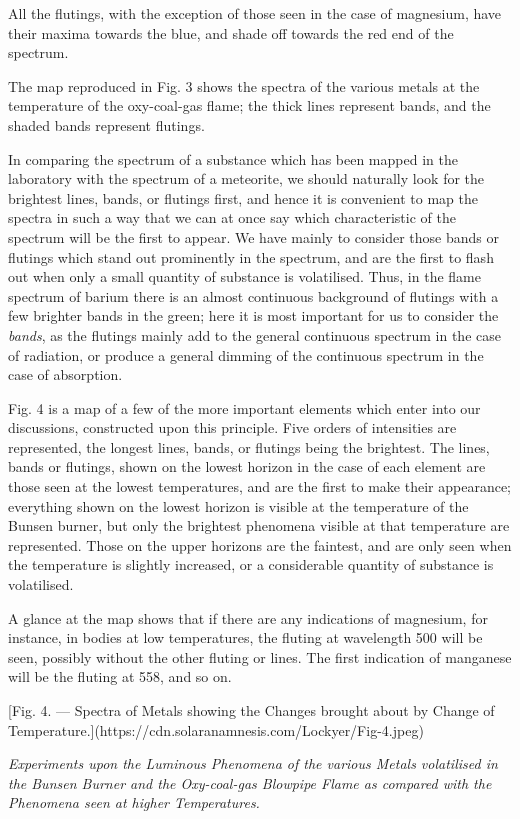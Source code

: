 \documentclass[a4paper, 12pt, oneside, polutonikogreek, english]{article}
\begin{document}
All the flutings, with the exception of those seen in the case of magnesium, have their maxima towards the blue, and shade off towards the red end of the spectrum.

The map reproduced in Fig. 3 shows the spectra of the various metals at the temperature of the oxy-coal-gas flame; the thick lines represent bands, and the shaded bands represent flutings.

In comparing the spectrum of a substance which has been mapped in the laboratory with the spectrum of a meteorite, we should naturally look for the brightest lines, bands, or flutings first, and hence it is convenient to map the spectra in such a way that we can at once say which characteristic of the spectrum will be the first to appear. We have mainly to consider those bands or flutings which stand out prominently in the spectrum, and are the first to flash out when only a small quantity of substance is volatilised. Thus, in the flame spectrum of barium there is an almost continuous background of flutings with a few brighter bands in the green; here it is most important for us to consider the \emph{bands}, as the flutings mainly add to the general continuous spectrum in the case of radiation, or produce a general dimming of the continuous spectrum in the case of absorption.

Fig. 4 is a map of a few of the more important elements which enter into our discussions, constructed upon this principle. Five orders of intensities are represented, the longest lines, bands, or flutings being the brightest. The lines, bands or flutings, shown on the lowest horizon in the case of each element are those seen at the lowest temperatures, and are the first to make their appearance; everything shown on the lowest horizon is visible at the temperature of the Bunsen burner, but only the brightest phenomena visible at that temperature are represented. Those on the upper horizons are the faintest, and are only seen when the temperature is slightly increased, or a considerable quantity of substance is volatilised.

A glance at the map shows that if there are any indications of magnesium, for instance, in bodies at low temperatures, the fluting at wavelength 500 will be seen, possibly without the other fluting or lines. The first indication of manganese will be the fluting at 558, and so on.

[Fig. 4. --- Spectra of Metals showing the Changes brought about by Change of Temperature.](https://cdn.solaranamnesis.com/Lockyer/Fig-4.jpeg)
\begin{center}
\emph{Experiments upon the Luminous Phenomena of the various Metals volatilised in the Bunsen Burner and the Oxy-coal-gas Blowpipe Flame as compared with the Phenomena seen at higher Temperatures.}
\end{center}
\end{document}
